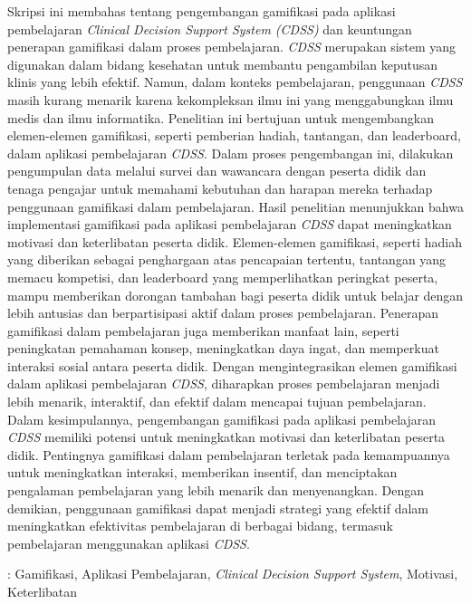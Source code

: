 Skripsi ini membahas tentang pengembangan gamifikasi pada aplikasi pembelajaran \textit{Clinical Decision Support System (\textit{CDSS})} dan keuntungan penerapan gamifikasi dalam proses pembelajaran. 
\textit{CDSS} merupakan sistem yang digunakan dalam bidang kesehatan untuk membantu pengambilan keputusan klinis yang lebih efektif. 
Namun, dalam konteks pembelajaran, penggunaan \textit{CDSS} masih kurang menarik karena kekompleksan ilmu ini yang menggabungkan ilmu medis dan ilmu informatika.
Penelitian ini bertujuan untuk mengembangkan elemen-elemen gamifikasi, seperti pemberian hadiah, tantangan, dan leaderboard, dalam aplikasi pembelajaran \textit{CDSS}. 
Dalam proses pengembangan ini, dilakukan pengumpulan data melalui survei dan wawancara dengan peserta didik dan tenaga pengajar untuk memahami kebutuhan dan harapan mereka terhadap penggunaan gamifikasi dalam pembelajaran.
Hasil penelitian menunjukkan bahwa implementasi gamifikasi pada aplikasi pembelajaran \textit{CDSS} dapat meningkatkan motivasi dan keterlibatan peserta didik. Elemen-elemen gamifikasi, seperti hadiah yang diberikan sebagai penghargaan atas pencapaian tertentu, tantangan yang memacu kompetisi, dan leaderboard yang memperlihatkan peringkat peserta, mampu memberikan dorongan tambahan bagi peserta didik untuk belajar dengan lebih antusias dan berpartisipasi aktif dalam proses pembelajaran.
Penerapan gamifikasi dalam pembelajaran juga memberikan manfaat lain, seperti peningkatan pemahaman konsep, meningkatkan daya ingat, dan memperkuat interaksi sosial antara peserta didik. Dengan mengintegrasikan elemen gamifikasi dalam aplikasi pembelajaran \textit{CDSS}, diharapkan proses pembelajaran menjadi lebih menarik, interaktif, dan efektif dalam mencapai tujuan pembelajaran.
Dalam kesimpulannya, pengembangan gamifikasi pada aplikasi pembelajaran \textit{CDSS} memiliki potensi untuk meningkatkan motivasi dan keterlibatan peserta didik. Pentingnya gamifikasi dalam pembelajaran terletak pada kemampuannya untuk meningkatkan interaksi, memberikan insentif, dan menciptakan pengalaman pembelajaran yang lebih menarik dan menyenangkan. Dengan demikian, penggunaan gamifikasi dapat menjadi strategi yang efektif dalam meningkatkan efektivitas pembelajaran di berbagai bidang, termasuk pembelajaran menggunakan aplikasi \textit{CDSS}.

 : Gamifikasi, Aplikasi Pembelajaran, \textit{Clinical Decision Support System}, Motivasi, Keterlibatan

\vspace{1cm}

